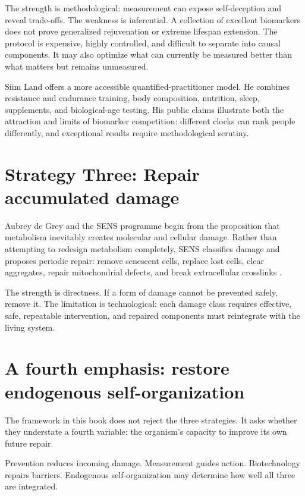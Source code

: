 The strength is methodological: measurement can expose self-deception and reveal trade-offs. The weakness is inferential. A collection of excellent biomarkers does not prove generalized rejuvenation or extreme lifespan extension. The protocol is expensive, highly controlled, and difficult to separate into causal components. It may also optimize what can currently be measured better than what matters but remains unmeasured.

Siim Land offers a more accessible quantified-practitioner model. He combines resistance and endurance training, body composition, nutrition, sleep, supplements, and biological-age testing. His public claims illustrate both the attraction and limits of biomarker competition: different clocks can rank people differently, and exceptional results require methodological scrutiny.

\section{Strategy Three: Repair accumulated damage}\label{strategy-three-repair-accumulated-damage}

Aubrey de Grey and the SENS programme begin from the proposition that metabolism inevitably creates molecular and cellular damage. Rather than attempting to redesign metabolism completely, SENS classifies damage and proposes periodic repair: remove senescent cells, replace lost cells, clear aggregates, repair mitochondrial defects, and break extracellular crosslinks \autocite{degrey2004escape,degrey2007ending}.

The strength is directness. If a form of damage cannot be prevented safely, remove it. The limitation is technological: each damage class requires effective, safe, repeatable intervention, and repaired components must reintegrate with the living system.

\section{A fourth emphasis: restore endogenous self-organization}\label{a-fourth-emphasis-restore-endogenous-self-organization}

The framework in this book does not reject the three strategies. It asks whether they understate a fourth variable: the organism's capacity to improve its own future repair.

Prevention reduces incoming damage. Measurement guides action. Biotechnology repairs barriers. Endogenous self-organization may determine how well all three are integrated.

